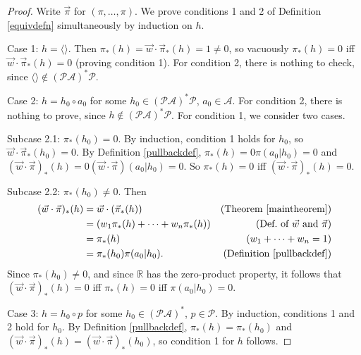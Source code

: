 \documentclass[runningheads]{llncs}
\begin{document}
\begin{proof}
    Write $\vec\pi$ for $(\pi,\ldots,\pi)$.
    We prove conditions 1 and 2 of Definition \ref{equivdefn}
    simultaneously by induction on $h$.
 
    Case 1: $h=\langle\rangle$. Then
    $\pi_*(h)=\vec w\cdot\vec\pi_*(h)=1\not=0$, so
    vacuously $\pi_*(h)=0$ iff $\vec w\cdot\vec\pi_*(h)=0$
    (proving condition 1).
    For condition 2, there is nothing to check, since
    $\langle\rangle\not\in(\mathcal P\mathcal A)^*\mathcal P$.

    Case 2: $h=h_0\circ a_0$ for some
        $h_0\in(\mathcal P\mathcal A)^*\mathcal P$, $a_0\in\mathcal A$.
        For condition 2, there is nothing to prove, since
        $h\not\in(\mathcal P\mathcal A)^*\mathcal P$.
        For condition 1, we consider two cases.

        Subcase 2.1: $\pi_*(h_0)=0$.
        By induction, condition 1 holds for $h_0$, so
        $\vec w\cdot\vec\pi_*(h_0)=0$.
        By Definition \ref{pullbackdef},
        $\pi_*(h)=0\pi(a_0|h_0)=0$
        and $(\vec w\cdot\vec\pi)_*(h)=0(\vec w\cdot\vec\pi)(a_0|h_0)=0$.
        So $\pi_*(h)=0$ iff $(\vec w\cdot\vec\pi)_*(h)=0$.

        Subcase 2.2: $\pi_*(h_0)\not=0$.
        Then
        \begin{align*}
            (\vec w\cdot \vec\pi)_*(h)
                &= \vec w\cdot(\vec\pi_*(h))
                    &\mbox{(Theorem \ref{maintheorem})}\\
                &= (w_1\pi_*(h)+\cdots+w_n\pi_*(h))
                    &\mbox{(Def.\ of $\vec w$ and $\vec\pi$)}\\
                &= \pi_*(h)
                    &\mbox{($w_1+\cdots+w_n=1$)}\\
                &= \pi_*(h_0)\pi(a_0|h_0).
                    &\mbox{(Definition \ref{pullbackdef})}
        \end{align*}
        Since $\pi_*(h_0)\not=0$, and since $\mathbb R$ has the zero-product property,
        it follows that
        $(\vec w\cdot\vec\pi)_*(h)=0$ iff $\pi_*(h)=0$ iff $\pi(a_0|h_0)=0$.

    Case 3: $h=h_0\circ p$ for some $h_0\in (\mathcal P\mathcal A)^*$,
        $p\in\mathcal P$.
        By induction, conditions 1 and 2 hold for $h_0$.
        By Definition \ref{pullbackdef},
        $\pi_*(h)=\pi_*(h_0)$ and $(\vec w\cdot\vec\pi)_*(h)=(\vec w\cdot\vec\pi)_*(h_0)$,
        so condition 1 for $h$ follows.


\end{proof}
\end{document}
